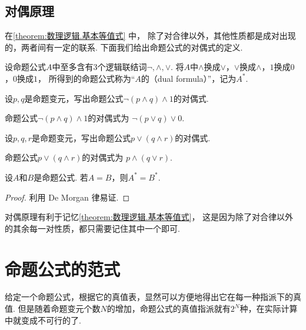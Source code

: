 \subsection{对偶原理}
在\cref{theorem:数理逻辑.基本等值式} 中，
除了对合律以外，其他性质都是成对出现的，两者间有一定的联系.
下面我们给出命题公式的对偶式的定义.
\begin{definition}
设命题公式\(A\)中至多含有3个逻辑联结词\(\neg,\land,\lor\).
将\(A\)中\(\land\)换成\(\lor\)，\(\lor\)换成\(\land\)，\(1\)换成\(0\)，\(0\)换成\(1\)，
所得到的命题公式称为“\(A\)的（dual formula）”，记为\(A^*\).
\end{definition}

\begin{example}
设\(p,q\)是命题变元，写出命题公式\(\neg(p \land q) \land 1\)的对偶式.
\begin{solution}
命题公式\(\neg(p \land q) \land 1\)的对偶式为
\(\neg(p \lor q) \lor 0\).
\end{solution}
\end{example}

\begin{example}
设\(p,q,r\)是命题变元，写出命题公式\(p \lor (q \land r)\)的对偶式.
\begin{solution}
命题公式\(p \lor (q \land r)\)的对偶式为
\(p \land (q \lor r)\).
\end{solution}
\end{example}

\begin{theorem}[对偶原理]
设\(A\)和\(B\)是命题公式.
若\(A = B\)，则\(A^* = B^*\).
\begin{proof}
利用 De Morgan 律易证.
\end{proof}
\end{theorem}

对偶原理有利于记忆\cref{theorem:数理逻辑.基本等值式}，
这是因为除了对合律以外的其余每一对性质，都只需要记住其中一个即可.

\section{命题公式的范式}
给定一个命题公式，根据它的真值表，显然可以方便地得出它在每一种指派下的真值.
但是随着命题变元个数\(N\)的增加，命题公式的真值指派就有\(2^N\)种，在实际计算中就变成不可行的了.

